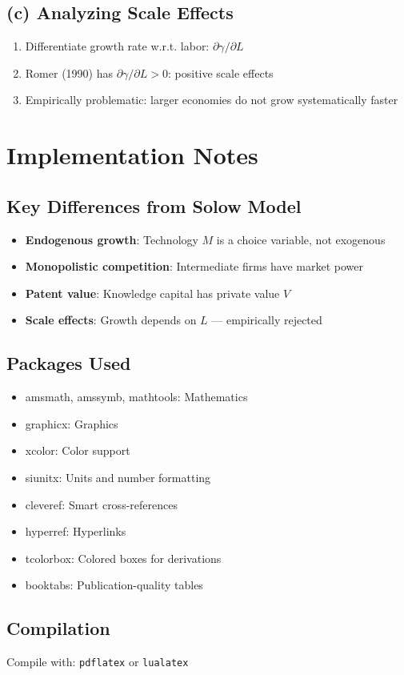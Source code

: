 \documentclass[a4paper,11pt]{article}
\begin{document}
\subsection*{(c) Analyzing Scale Effects}
\begin{enumerate}
    \item Differentiate growth rate w.r.t. labor: $\partial\gamma/\partial L$
    \item Romer (1990) has $\partial\gamma/\partial L > 0$: positive scale effects
    \item Empirically problematic: larger economies do not grow systematically faster
\end{enumerate}

\clearpage

\section{Implementation Notes}

\subsection*{Key Differences from Solow Model}
\begin{itemize}
    \item \textbf{Endogenous growth}: Technology $M$ is a choice variable, not exogenous
    \item \textbf{Monopolistic competition}: Intermediate firms have market power
    \item \textbf{Patent value}: Knowledge capital has private value $V$
    \item \textbf{Scale effects}: Growth depends on $L$ --- empirically rejected
\end{itemize}

\subsection*{Packages Used}
\begin{itemize}
    \item amsmath, amssymb, mathtools: Mathematics
    \item graphicx: Graphics
    \item xcolor: Color support
    \item siunitx: Units and number formatting
    \item cleveref: Smart cross-references
    \item hyperref: Hyperlinks
    \item tcolorbox: Colored boxes for derivations
    \item booktabs: Publication-quality tables
\end{itemize}

\subsection*{Compilation}
Compile with: \texttt{pdflatex} or \texttt{lualatex}

\clearpage
\end{document}
